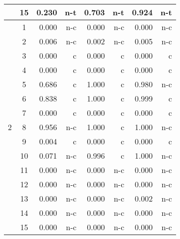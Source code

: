 \documentclass{article}
\newcommand{\gr}{\cellcolor[gray]{0.9}}
\begin{document}
\begin{table}
\begin{center}
\begin{tabular}{lc|rr|rr|rr}
& 15 & 0.230     & n-t & 0.703      &  n-t & 0.924     & n-t  \\
\hline
\multirow{15}{*}{2}
& 1  & \gr 0.000 & n-c & \gr 0.000 & n-c & \gr 0.000  &  n-c \\
& 2  & \gr 0.006 & n-c & \gr 0.002 & n-c & \gr 0.005  &  n-c \\
& 3  & \gr 0.000 & c & \gr 0.000 & c & \gr 0.000  &  c \\
& 4  & \gr 0.000 & c & \gr 0.000 & c & \gr 0.000  &  c \\
& 5  & 0.686     & c  & 1.000    & c & 0.980      &  n-c  \\
& 6  & 0.838     & c  & 1.000    & c & 0.999      & c   \\
& 7  & \gr 0.000 & c & \gr 0.000 & c & \gr 0.000  &  c \\
& 8  & 0.956     & n-c  & 1.000    & c & 1.000    &  n-c  \\
& 9  & \gr 0.004 & c & \gr 0.000 & c & \gr 0.000  &  c \\
& 10 & \gr 0.071 & n-c  & 0.996    & c & 1.000    & n-c   \\
& 11 & \gr 0.000 & n-c & \gr 0.000 & n-c & \gr 0.000  &  n-c \\
& 12 & \gr 0.000 & n-c & \gr 0.000 & n-c & \gr 0.000  &  n-c \\
& 13 & \gr 0.000 & n-c & \gr 0.000 & n-c & \gr 0.002  &  n-c \\
& 14 & \gr 0.000 & n-c & \gr 0.000 & n-c & \gr 0.000  &  n-c \\
& 15 & \gr 0.000 & n-c & \gr 0.000 & n-c & \gr 0.000  &  n-c \\
\hline
\end{tabular}
\end{center}
\label{table:kCCAforClusters}
\end{table}
\clearpage
\end{document}
